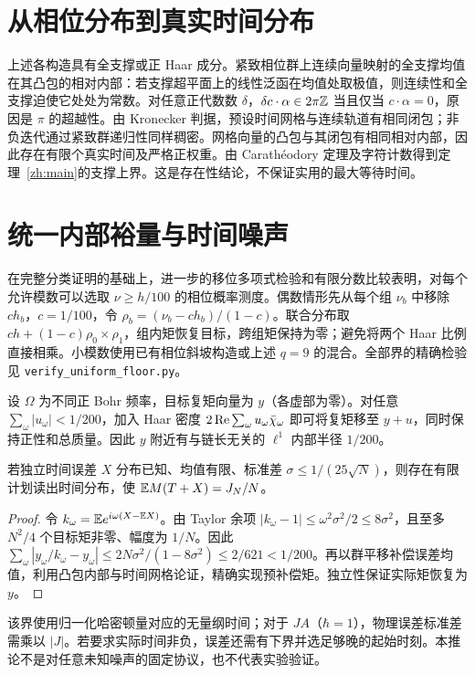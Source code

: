 \documentclass[UTF8,fontset=none,11pt]{ctexart}
\begin{document}
\section{从相位分布到真实时间分布}
上述各构造具有全支撑或正 Haar 成分。紧致相位群上连续向量映射的全支撑均值在其凸包的相对内部：若支撑超平面上的线性泛函在均值处取极值，则连续性和全支撑迫使它处处为常数。对任意正代数数 $\delta$，$\delta c\cdot\alpha\in2\pi\mathbb Z$ 当且仅当 $c\cdot\alpha=0$，原因是 $\pi$ 的超越性。由 Kronecker 判据，预设时间网格与连续轨道有相同闭包；非负迭代通过紧致群递归性同样稠密。网格向量的凸包与其闭包有相同相对内部\cite[定理6.3]{rockafellar}，因此存在有限个真实时间及严格正权重。由 Carath\'eodory 定理及字符计数得到定理~\ref{zh:main}的支撑上界。这是存在性结论，不保证实用的最大等待时间。
\section{统一内部裕量与时间噪声}
在完整分类证明的基础上，进一步的移位多项式检验和有限分数比较表明，对每个允许模数可以选取 $\nu\ge h/100$ 的相位概率测度。偶数情形先从每个组 $\nu_b$ 中移除 $ch_b$，$c=1/100$，令 $\rho_b=(\nu_b-ch_b)/(1-c)$。联合分布取 $ch+(1-c)\rho_0\times\rho_1$，组内矩恢复目标，跨组矩保持为零；避免将两个 Haar 比例直接相乘。小模数使用已有相位斜坡构造\cite{kang}或上述 $q=9$ 的混合。全部界的精确检验见 \texttt{verify\_uniform\_floor.py}。

设 $\Omega$ 为不同正 Bohr 频率，目标复矩向量为 $y$（各虚部为零）。对任意 $\sum_\omega|u_\omega|<1/200$，加入 Haar 密度 $2\operatorname{Re}\sum_\omega u_\omega\bar\chi_\omega$ 即可将复矩移至 $y+u$，同时保持正性和总质量。因此 $y$ 附近有与链长无关的 $\ell^1$ 内部半径 $1/200$。
\begin{corollary}
若独立时间误差 $X$ 分布已知、均值有限、标准差 $\sigma\le1/(25\sqrt N)$，则存在有限计划读出时间分布，使 $\mathbb E M(T+X)=J_N/N$。
\end{corollary}
\begin{proof}令 $k_\omega=\mathbb E e^{i\omega(X-\mathbb E X)}$。由 Taylor 余项 $|k_\omega-1|\le\omega^2\sigma^2/2\le8\sigma^2$，且至多 $N^2/4$ 个目标矩非零、幅度为 $1/N$。因此 $\sum_\omega |y_\omega/k_\omega-y_\omega|\le2N\sigma^2/(1-8\sigma^2)\le2/621<1/200$。再以群平移补偿误差均值，利用凸包内部与时间网格论证，精确实现预补偿矩。独立性保证实际矩恢复为 $y$。\end{proof}
该界使用归一化哈密顿量对应的无量纲时间；对于 $JA$（$\hbar=1$），物理误差标准差需乘以 $|J|$。若要求实际时间非负，误差还需有下界并选足够晚的起始时刻。本推论不是对任意未知噪声的固定协议，也不代表实验验证。
\end{document}

